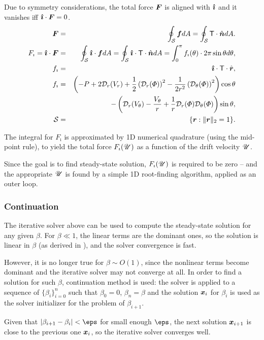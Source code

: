 Due to symmetry considerations, the total force $\boldsymbol{F}$ is 
aligned with $\boldsymbol{\hat{\imath}}$ and it vanishes iff $\boldsymbol{\hat{\imath}} \cdot \boldsymbol{F} = 0$.
\begin{eqnarray}
\boldsymbol{F} &=& \oint_\mathcal{S} \boldsymbol{f}  dA = 
\oint_\mathcal{S} \mathsf{T} \cdot \hat{\boldsymbol{n}}  dA. \\
F_\imath = \boldsymbol{\hat{\imath}} \cdot \boldsymbol{F} &=& \oint_\mathcal{S} \boldsymbol{\hat{\imath}} \cdot \boldsymbol{f}  dA = 
\oint_\mathcal{S} \boldsymbol{\hat{\imath}} \cdot \mathsf{T} \cdot \hat{\boldsymbol{n}}  dA = 
\int_0^\pi f_\imath(\theta) \cdot 2\pi \sin\theta d\theta ,
\\  
f_\imath &=& \boldsymbol{\hat{\imath}} \cdot \mathsf{T} \cdot \hat{\boldsymbol{r}},
\\  
f_\imath &=& \left(-P + 2\mathcal{D}_r(V_r) + 
\frac{1}{2}\left(\mathcal{D}_r(\varPhi)\right)^2 - \frac{1}{2r^2}\left(\mathcal{D}_\theta(\varPhi)\right)^2\right)\cos\theta 
\\  
&& -\left(\mathcal{D}_r(V_\theta) - \frac{V_\theta}{r}
+ \frac{1}{r}\mathcal{D}_r(\varPhi) \mathcal{D}_{\theta}(\varPhi)\right)\sin\theta, \\
 \mathcal{S} &=& \{\boldsymbol{r} : \|\boldsymbol{r}\|_2 = 1\}.
\end{eqnarray}

The integral for $F_\imath$ is approximated by 1D numerical quadrature
(using the mid-point rule), to yield 
the total force $F_\imath(\mathscr{U})$ as a function of the drift velocity $\mathscr{U}$.

Since the goal is to find steady-state solution, $F_\imath(\mathscr{U})$ 
is required to be zero --
and the appropriate $\mathscr{U}$ is found by a simple 1D root-finding algorithm,
applied as an outer loop.

\subsubsection{Continuation}

The iterative solver above can be used to compute the steady-state solution for any given $\beta$.
For $\beta \ll 1$, the linear terms are the dominant ones, so the solution is linear in $\beta$ 
(as derived in \cite{yariv2010migration}), and the solver convergence is fast.

However, it is no longer true for $\beta \sim O(1)$, since the nonlinear terms become dominant
and the iterative solver may not converge at all.
In order to find a solution for such $\beta$, continuation method is used:
the solver is applied to a sequence of $\{\beta_i\}_{i=0}^n$ such that $\beta_0 = 0$,
$\beta_n = \beta$ and the solution $\boldsymbol{x}_i$ for $\beta_i$ is used as the solver initializer
for the problem of $\beta_{i+1}$.

Given that $|\beta_{i+1} - \beta_i| < \eps$ for small enough $\eps$, 
the next solution $\boldsymbol{x}_{i+1}$ is close to the previous one $\boldsymbol{x}_i$,
so the iterative solver converges well.

